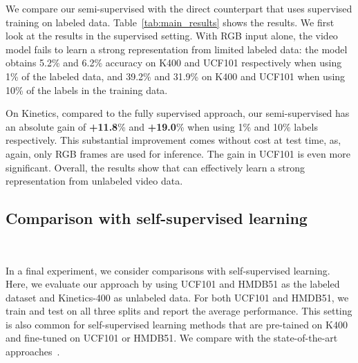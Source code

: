\documentclass[10pt,twocolumn,letterpaper]{article}
\begin{document}
We compare our semi-supervised \oursshort with the direct counterpart that uses supervised training on labeled data.
Table~\ref{tab:main_results} {shows the results}. We first look at the results in the supervised setting. With RGB input alone, the video model fails to learn a strong representation from limited labeled data: the model obtains 5.2\% and 6.2\% accuracy on K400 and UCF101 respectively when using 1\% of the labeled data, and 39.2\% and 31.9\% on K400 and UCF101 when using 10\% of the labels in the training data. 
 
On Kinetics, compared to the fully supervised approach, our semi-supervised \oursshort has an absolute gain of \textbf{+11.8}\% and \textbf{+19.0}\% when using 1\% and 10\% labels  respectively. This substantial improvement comes without cost at test time, as, again, only RGB frames are used for \oursshort inference. 
The gain in UCF101 is even more significant. {Overall, the results show that \oursshort can effectively learn a strong representation from unlabeled video data}.
 

\vspace{10pt}
\subsection{Comparison with self-supervised learning}~\label{sec:out}

{In a final experiment, we consider comparisons with self-supervised learning.}
Here, we evaluate our approach by using UCF101 and HMDB51 as the labeled dataset and Kinetics-400 as unlabeled data. 
{For both UCF101 and HMDB51,
we train and test on all three splits and report the average performance.}
 This setting is also common for self-supervised learning methods that are pre-tained on K400 and fine-tuned on UCF101 or HMDB51. We compare with the state-of-the-art approaches~\cite{alwassel2019self,avid,patrick2020multi,benaim2020speednet,Han20,yang2020video}. 
\end{document}
